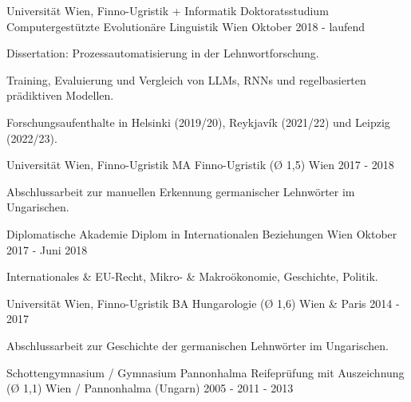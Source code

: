 

\begin{cventries}

  \cventry
    {Universität Wien, Finno-Ugristik + Informatik} %
    {Doktoratsstudium Computergestützte Evolutionäre Linguistik} %
    {Wien} %
    {Oktober 2018 - laufend} %
    {
      \begin{cvitems} %
        \item{Dissertation: Prozessautomatisierung in der Lehnwortforschung.}
        \item{Training, Evaluierung und Vergleich von LLMs, RNNs und regelbasierten prädiktiven Modellen.}
        \item{Forschungsaufenthalte in Helsinki (2019/20), Reykjavík (2021/22) und Leipzig (2022/23).}
      \end{cvitems}
    }

  \cventry
    {Universität Wien, Finno-Ugristik} %
    {MA Finno-Ugristik (Ø 1,5)} %
    {Wien} %
    {2017 - 2018} %
    {
      \begin{cvitems} %
        \item {Abschlussarbeit zur manuellen Erkennung germanischer Lehnwörter im Ungarischen.}
      \end{cvitems}
    }

  \cventry
    {Diplomatische Akademie} %
    {Diplom in Internationalen Beziehungen} %
    {Wien} %
    {Oktober 2017 - Juni 2018} %
    {
    \begin{cvitems} %
        \item{Internationales \& EU-Recht, Mikro- \& Makroökonomie, Geschichte, Politik.}
      \end{cvitems}
    }
    
  \cventry
    {Universität Wien, Finno-Ugristik} %
    {BA Hungarologie (Ø 1,6)} %
    {Wien \& Paris} %
    {2014 - 2017} %
    {
      \begin{cvitems} %
        \item {Abschlussarbeit zur Geschichte der germanischen Lehnwörter im Ungarischen.}
      \end{cvitems}
    }
        
  \cventry
    {Schottengymnasium / Gymnasium Pannonhalma} %
    {Reifeprüfung mit Auszeichnung (Ø 1,1)} %
    {Wien / Pannonhalma (Ungarn)} %
    {2005 - 2011 - 2013} %
    {}
\end{cventries}

